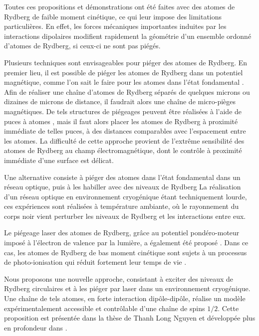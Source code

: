 Toutes ces propositions et démonstrations ont été faites avec des atomes de Rydberg de faible moment cinétique, ce qui leur impose des limitations particulières.
En effet, les forces mécaniques importantes induites par les interactions dipolaires modifient rapidement la géométrie d'un ensemble ordonné d'atomes de Rydberg, si ceux-ci ne sont pas piégés.

Plusieurs techniques sont envisageables pour piéger des atomes de Rydberg.
En premier lieu, il est possible de piéger les atomes de Rydberg dans un potentiel magnétique, comme l'on sait le faire pour les atomes dans l'état fondamental \cite{MX_RAITHELTRAPPERDYD05}.
Afin de réaliser une chaîne d'atomes de Rydberg séparés de quelques microns ou dizaines de microns de distance, il faudrait alors une chaîne de micro-pièges magnétiques.
De tels structures de piégeages peuvent être réalisées à l'aide de puces à atomes \cite{muller2010trapping}, mais il faut alors placer les atomes de Rydberg à proximité immédiate de telles puces, à des distances comparables avec l'espacement entre les atomes.
La difficulté de cette approche provient de l'extrême sensibilité des atomes de Rydberg au champ électromagnétique, dont le contrôle à proximité immédiate d'une surface est délicat.

Une alternative consiste à piéger des atomes dans l'état fondamental dans un réseau optique, puis à les habiller avec des niveaux de Rydberg \cite{Johnson2010,Zeiher2016,Bijnen2015,Glaetzle2015,Macri2014}
La réalisation d'un réseau optique en environnement cryogénique étant techniquement lourde, ces expériences sont réalisées à température ambiante, où le rayonnement du corps noir vient perturber les niveaux de Rydberg et les interactions entre eux.

Le piégeage laser des atomes de Rydberg, grâce au potentiel pondéro-moteur imposé à l'électron de valence par la lumière, a également été proposé \cite{MX_RAITHELTRAP00}.
Dans ce cas, les atomes de Rydberg de bas moment cinétique sont sujets à un processus de photo-ionisation qui réduit fortement leur temps de vie \cite{MX_RAITHELPHOTION13}.

\bigskip
Nous proposons une nouvelle approche, consistant à exciter des niveaux de Rydberg circulaires et à les piéger par laser dans un environnement cryogénique.
Une chaîne de tels atomes, en forte interaction dipôle-dipôle,  réalise un modèle expérimentalement accessible et contrôlable d'une chaîne de spins $1/2$.
Cette proposition est présentée dans la thèse de Thanh Long Nguyen \cite{PHD_NGUYEN} et développée plus en profondeur dans \cite{ENS_PRE_CIRCSIM}.

